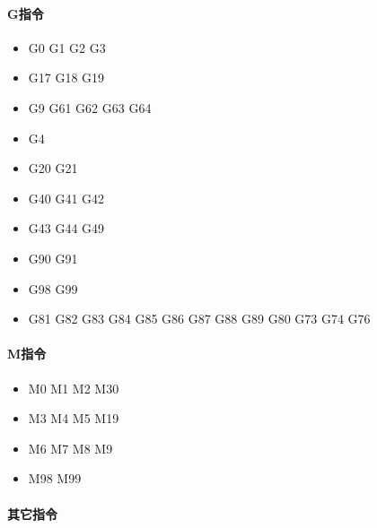 \paragraph{G指令}\begin{itemize}
	\item G0 G1 G2 G3

	\item G17 G18 G19

	\item G9 G61 G62 G63 G64

	\item G4 

	\item G20 G21

	\item G40 G41 G42 

	\item G43 G44 G49 

	\item G90 G91

	\item G98 G99

	\item G81 G82 G83 G84 G85 G86 G87 G88 G89 G80 G73 G74 G76

\end{itemize}

\paragraph{M指令}

\begin{itemize}
	\item M0 M1 M2 M30

	\item M3 M4 M5 M19 

	\item M6 M7 M8 M9

	\item M98 M99

\end{itemize}

\paragraph{其它指令}
